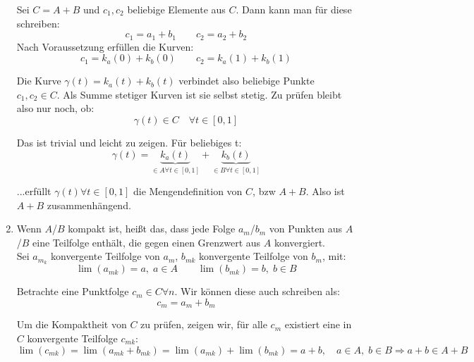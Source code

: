 \documentclass[a4paper,german,12pt,smallheadings]{scrartcl}
\begin{document}
\begin{enumerate}[(1)]
    Sei $C = A+B$ und $c_1, c_2$ beliebige Elemente aus $C$.
    Dann kann man für diese schreiben:
    \begin{equation*}
    c_1 = a_1 + b_1 \quad \quad c_2 = a_2 + b_2
    \end{equation*}
    Nach Voraussetzung erfüllen die Kurven:
    \begin{equation*}
    c_1 = k_a(0) + k_b(0) \quad \quad c_2=k_a(1)+k_b(1)
    \end{equation*} 
   	
   	Die Kurve $\gamma(t)=k_a(t)+k_b(t)$ verbindet also beliebige Punkte $c_1,c_2\in C$. Als Summe stetiger Kurven ist sie selbst stetig. Zu prüfen bleibt also nur noch, ob:
   	\begin{equation*}
   	\gamma(t)\in C \quad \forall t\in[0,1]
   	\end{equation*}
   	
   	Das ist trivial und leicht zu zeigen. Für beliebiges t:
   	\begin{equation*}
   	\gamma(t)=\underbrace{k_a(t)}_{\in A\forall t\in[0,1]}+\underbrace{k_b(t)}_{\in B\forall t\in[0,1]}
   	\end{equation*}
	
	...erfüllt $\gamma(t) \forall t\in[0,1]$ die Mengendefinition von $C$, bzw $A+B$.
    Also ist $A+B$ zusammenhängend.
  \item
    Wenn $A$/$B$ kompakt ist, heißt das, dass jede Folge $a_m$/$b_m$ von Punkten aus
    $A$/$B$ eine Teilfolge enthält, die gegen einen Grenzwert aus $A$ konvergiert.\\
    Sei $a_{m_k}$ konvergente Teilfolge von $a_m$, $b_{mk}$ konvergente Teilfolge von $b_m$, mit:
    \begin{equation*}
    \lim(a_{mk})=a, \; a\in A \quad \quad \lim(b_{mk})=b, \; b\in B
    \end{equation*}
    
    Betrachte eine Punktfolge $c_m\in C\forall n$. Wir können diese auch schreiben als:
    \begin{equation*}
    c_m=a_m+b_m
    \end{equation*}
    
    Um die Kompaktheit von $C$ zu prüfen, zeigen wir, für alle $c_{m}$ existiert eine in $C$ konvergente Teilfolge $c_{mk}$:
    \begin{equation*}
    \lim(c_{mk})=\lim(a_{mk}+b_{mk})=\lim({a_{mk}})+\lim({b_{mk}})=a + b,\quad a\in A,\; b\in B \Rightarrow a+b \in A + B
    \end{equation*}


\end{enumerate}
\end{document}
